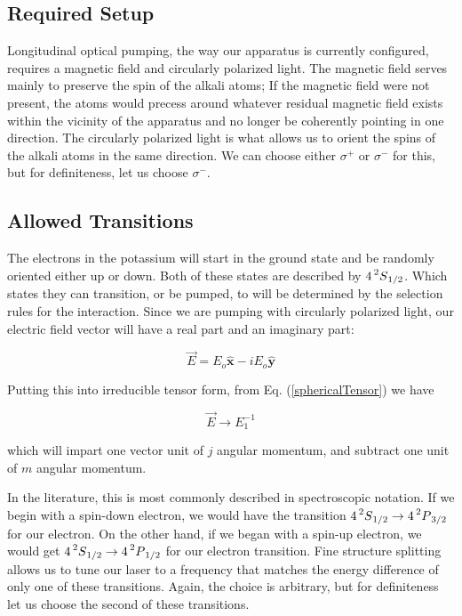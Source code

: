 \documentclass[12pt]{article}
\newcommand{\xhat}{\hat{\textbf{x}}}
\newcommand{\yhat}{\hat{\textbf{y}}}
\begin{document}
	\subsection{Required Setup}
    Longitudinal optical pumping, the way our apparatus is 
    currently configured, requires a magnetic field and
    circularly polarized light. The magnetic field
	serves mainly to preserve the spin of the alkali
	atoms; If the magnetic field were not 
	present, the atoms would precess around whatever
	residual magnetic field exists within the vicinity
	of the apparatus and no longer be coherently pointing
	in one direction. The circularly polarized light
	is what allows us to orient the spins of the alkali
	atoms in the same direction. We can choose either 
	$\sigma^{+}$ or $\sigma^{-}$ for this, but for 
	definiteness, let us choose $\sigma^{-}$.

	\subsection{Allowed Transitions}
	The electrons in the potassium will start in the ground
	state and be randomly oriented either up or down.
	Both of these states are described by 
	$4\prescript{2}{}S_{1/2}$.
	Which states they can transition, or be pumped, to 
	will be determined by the selection
	rules for the interaction. Since we are pumping with
	circularly polarized light, our electric field vector
	will have a real part and an imaginary part:
	
	\begin{equation}
		\vec{E}=E_o \xhat  -iE_o \yhat 
	\end{equation}

	Putting this into irreducible tensor form, 
	from Eq. (\ref{sphericalTensor})
	we have 

	\begin{equation}
		\vec{E} \rightarrow E^{-1}_1
	\end{equation}

	which will impart one vector unit of $j$ angular momentum,
	and subtract one unit of $m$ angular momentum. 

	In the literature, this is most
	commonly described in spectroscopic notation. If we begin 
	with a spin-down electron, we would have the transition
	$4\prescript{2}{}S_{1/2} \rightarrow 4\prescript{2}{}P_{3/2}$
	for our electron.
	On the other hand, if we began with a spin-up electron, we 
	would get 
	$4\prescript{2}{}S_{1/2} \rightarrow 4\prescript{2}{}P_{1/2}$
	for our electron transition. Fine structure splitting 
	allows us to tune our laser to a frequency that matches 
	the energy difference of only one of these transitions. 
	Again, the choice is arbitrary, but for definiteness let us
	choose the second of these transitions. 
\end{document}

